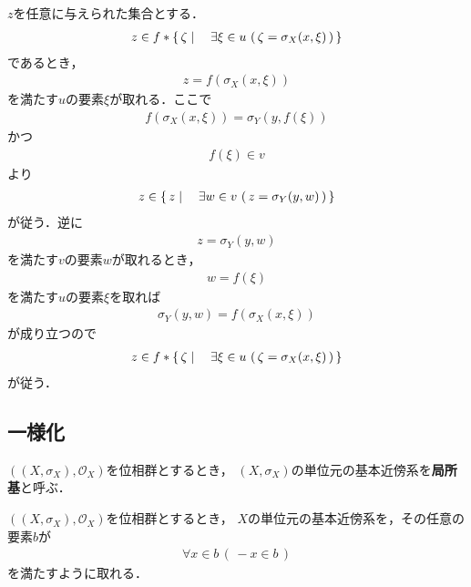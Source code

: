 	\begin{sketch}
		$z$を任意に与えられた集合とする．
		\begin{align}
			z \in f \ast \left\{\, \zeta \mid \quad \exists \xi \in u\, \left(\, \zeta = \sigma_X(x,\xi)\, \right)\, \right\}
		\end{align}
		であるとき，
		\begin{align}
			z = f\left(\sigma_X(x,\xi)\right)
		\end{align}
		を満たす$u$の要素$\xi$が取れる．ここで
		\begin{align}
			f\left(\sigma_X(x,\xi)\right) = \sigma_Y\left(y,f(\xi)\right)
		\end{align}
		かつ
		\begin{align}
			f(\xi) \in v
		\end{align}
		より
		\begin{align}
			z \in \left\{\, z \mid \quad \exists w \in v\, \left(\, z = \sigma_Y(y,w)\, \right)\, \right\}
		\end{align}
		が従う．逆に
		\begin{align}
			z = \sigma_Y(y,w)
		\end{align}
		を満たす$v$の要素$w$が取れるとき，
		\begin{align}
			w = f(\xi)
		\end{align}
		を満たす$u$の要素$\xi$を取れば
		\begin{align}
			\sigma_Y(y,w) = f\left(\sigma_X(x,\xi)\right)
		\end{align}
		が成り立つので
		\begin{align}
			z \in f \ast \left\{\, \zeta \mid \quad \exists \xi \in u\, \left(\, \zeta = \sigma_X(x,\xi)\, \right)\, \right\}
		\end{align}
		が従う．
		\QED
	\end{sketch}

\subsection{一様化}

	\begin{screen}
		\begin{dfn}[局所基]
			$\left(\left(X,\sigma_X\right),\mathscr{O}_X\right)$を位相群とするとき，
			$\left(X,\sigma_X\right)$の単位元の基本近傍系を{\bf 局所基}と呼ぶ．
		\end{dfn}
	\end{screen}
	
	\begin{screen}
		\begin{thm}[すべての要素が逆元で閉じている局所基が取れる]
		\label{thm:there_exists_a_local_base_whose_elements_are_closed_under_inversion}
			$\left(\left(X,\sigma_X\right),\mathscr{O}_X\right)$を位相群とするとき，
			$X$の単位元の基本近傍系を，その任意の要素$b$が
			\begin{align}
				\forall x \in b\, (\, -x \in b\, )
				\label{fom:thm_there_exists_a_local_base_whose_elements_are_closed_under_inversion}
			\end{align}
			を満たすように取れる．
		\end{thm}
	\end{screen}
	
